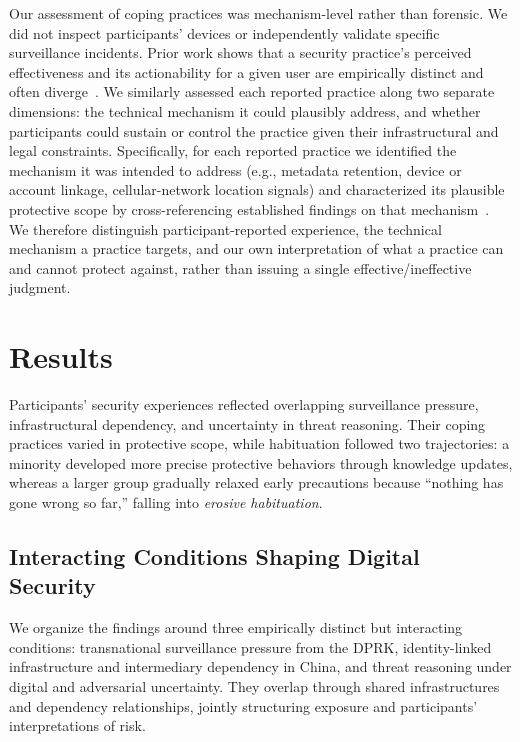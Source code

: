 \documentclass[conference,compsoc]{IEEEtran}
\begin{document}
Our assessment of coping practices was mechanism-level rather than forensic. We did not inspect participants' devices or independently validate specific surveillance incidents. Prior work shows that a security practice's perceived effectiveness and its actionability for a given user are empirically distinct and often diverge~\cite{redmiles2020comprehensive}. We similarly assessed each reported practice along two separate dimensions: the technical mechanism it could plausibly address, and whether participants could sustain or control the practice given their infrastructural and legal constraints. Specifically, for each reported practice we identified the mechanism it was intended to address (e.g., metadata retention, device or account linkage, cellular-network location signals) and characterized its plausible protective scope by cross-referencing established findings on that mechanism~\cite{narayanan2009anonymizing, mayer2016evaluating, tomasin2021location}. We therefore distinguish participant-reported experience, the technical mechanism a practice targets, and our own interpretation of what a practice can and cannot protect against, rather than issuing a single effective/ineffective judgment.










\section{Results}
\label{sec:findings}

Participants' security experiences reflected overlapping surveillance pressure, infrastructural dependency, and uncertainty in threat reasoning. Their coping practices varied in protective scope, while habituation followed two trajectories: a minority developed more precise protective behaviors through knowledge updates, whereas a larger group gradually relaxed early precautions because ``nothing has gone wrong so far,'' falling into \emph{erosive habituation}.

\subsection{Interacting Conditions Shaping Digital Security}
\label{subsec:interacting-conditions}

We organize the findings around three empirically distinct but interacting conditions: transnational surveillance pressure from the DPRK, identity-linked infrastructure and intermediary dependency in China, and threat reasoning under digital and adversarial uncertainty. They overlap through shared infrastructures and dependency relationships, jointly structuring exposure and participants' interpretations of risk.
\end{document}
